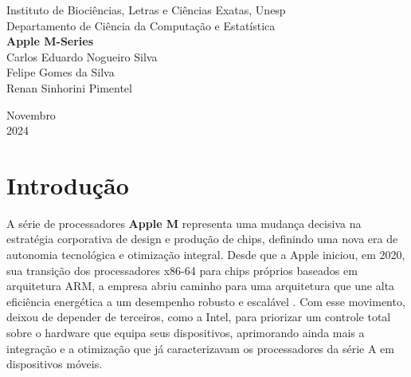 \documentclass[a4paper,times,12pt]{article}
\begin{document}
\begin{titlepage}
	\begin{center}
	

		\Huge{Instituto de Bioci\^{e}ncias, Letras e Ci\^{e}ncias Exatas, Unesp}\\
		\large{Departamento de Ciência da Computação e Estatística}\\ 
		
		\vspace{15pt}
        \vspace{95pt}
        \textbf{\LARGE{Apple M-Series}}\\
		\vspace{3,5cm}
        Carlos Eduardo Nogueiro Silva\\
        Felipe Gomes da Silva \\
        Renan Sinhorini Pimentel \\
	\end{center}
	
	
	\vspace{1cm}
	\begin{center}
		\vspace{\fill}
		 Novembro\\
		 2024
			\end{center}
\end{titlepage}
\newpage
\tableofcontents
\thispagestyle{empty}
\newpage
\section{Introdução}
\hspace*{+15pt} 
A série de processadores \textbf{Apple M} representa uma mudança decisiva na estratégia corporativa de design e produção de chips, definindo uma nova era de autonomia tecnológica e otimização integral. Desde que a Apple iniciou, em 2020, sua transição dos processadores x86-64 para chips próprios baseados em arquitetura ARM, a empresa abriu caminho para uma arquitetura que une alta eficiência energética a um desempenho robusto e escalável \cite{apple_silicon_overview}. Com esse movimento, deixou de depender de terceiros, como a Intel, para priorizar um controle total sobre o hardware que equipa seus dispositivos, aprimorando ainda mais a integração e a otimização que já caracterizavam os processadores da série A em dispositivos móveis.
\end{document}
